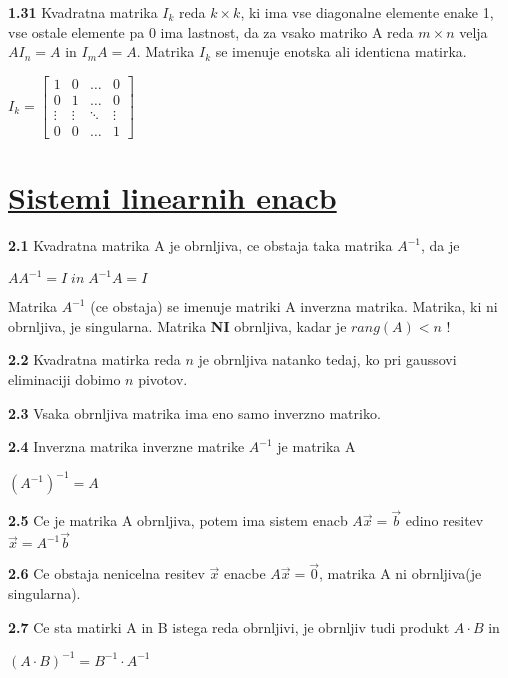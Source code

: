 \documentclass{article}
\begin{document}
\begin{multicols}{4}
\textbf{1.31} Kvadratna matrika $I_{k}$ reda $k \times k$, ki ima vse diagonalne
elemente enake 1, vse ostale elemente pa 0 ima lastnost, da za vsako matriko A
reda $m \times n$ velja $AI_{n} = A$ in $I_{m}A = A$. Matrika $I_{k}$ se imenuje
enotska ali identicna matirka.
\begin{center}
    $I_{k}=
    \begin{bmatrix}
        1 & 0 & \hdots & 0\\
        0 & 1 & \hdots & 0 \\
        \vdots & \vdots & \ddots & \vdots\\
        0 & 0 & \hdots & 1
    \end{bmatrix} 
    $
\end{center}

\section{\underline{Sistemi linearnih enacb}}

\textbf{2.1} Kvadratna matrika A je obrnljiva, ce obstaja taka matrika
$A^{-1}$, da je
\begin{center}
    $AA^{-1} = I\;
    in\;
    A^{-1}A = I
    $
\end{center}
Matrika $A^{-1}$ (ce obstaja) se imenuje matriki A inverzna matrika.
Matrika, ki ni obrnljiva, je singularna. Matrika \textbf{NI} obrnljiva, kadar je
$rang(A) < n$ !

\textbf{2.2} Kvadratna matirka reda $n$ je obrnljiva natanko tedaj, ko pri
gaussovi eliminaciji dobimo $n$ pivotov.

\textbf{2.3} Vsaka obrnljiva matrika ima eno samo inverzno matriko.

\textbf{2.4} Inverzna matrika inverzne matrike $A^{-1}$ je matrika A
\begin{center}
    $(A^{-1})^{-1} = A$
\end{center}

\textbf{2.5} Ce je matrika A obrnljiva, potem ima sistem enacb
$A\vec{x} = \vec{b}$ edino resitev $\vec{x} = A^{-1} \vec{b}$

\textbf{2.6} Ce obstaja nenicelna resitev $\vec{x}$ enacbe $A\vec{x} = \vec{0}$,
matrika A ni obrnljiva(je singularna).

\textbf{2.7} Ce sta matirki A in B istega reda obrnljivi, je obrnljiv tudi
produkt $A \cdot B$ in
\begin{center}
    $(A \cdot B)^{-1} =
    B^{-1} \cdot A^{-1}
    $
\end{center}


\end{multicols}
\end{document}
